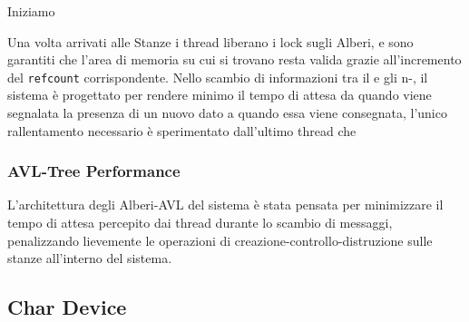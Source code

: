 Iniziamo

Una volta arrivati alle Stanze i thread liberano i lock sugli Alberi, e sono garantiti che l'area di memoria su cui si
trovano resta valida grazie all'incremento del \texttt{refcount} corrispondente.
Nello scambio di informazioni tra il \Writer e gli n-\Reader, il sistema è progettato per rendere minimo il tempo di
attesa da quando viene segnalata la presenza di un nuovo dato a quando essa viene consegnata, l'unico rallentamento
necessario è sperimentato dall'ultimo thread che



\subsubsection{AVL-Tree Performance} \label{treePerf}

L'architettura degli Alberi-AVL del sistema è stata pensata per minimizzare il tempo di attesa percepito dai thread
durante lo scambio di messaggi, penalizzando lievemente le operazioni di creazione-controllo-distruzione sulle stanze
all'interno del sistema.

\subsection{Char Device} \label{CharDevice}
